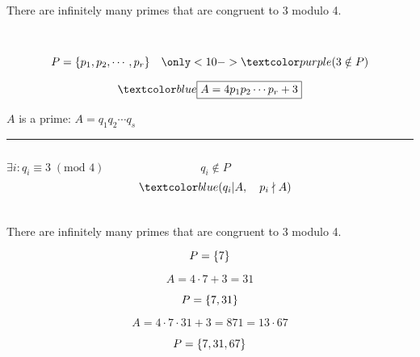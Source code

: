 
\begin{frame}{}
  \begin{Theorem}
    There are infinitely many primes that are congruent to 3 modulo 4.
  \end{Theorem}

  \pause
  \begin{center}
     \\
    
    \pause
    \vspace{-0.50cm}
    \[
      P = \set{p_1, p_2, \cdots, p_r} \quad \only<10->{\purple{(3 \notin P)}}
    \]

    \pause
    \vspace{-1.00cm}
    \[
      \blue{\boxed{A = 4 p_1 p_2 \cdots p_r + 3}}
    \]

    \pause
    $A$ is  a prime: $A = q_1 q_2 \cdots q_s$
  \end{center}

  \hrule
  \begin{columns}
      \pause
      \[
	\exists i: q_i \equiv 3\; (\text{mod } 4)
      \]
      \pause
      \vspace{-0.80cm}
      \begin{center}
	{}
      \end{center}
      \pause
      \[
	q_i \notin P
      \]
      \pause
      \vspace{-0.40cm}
      \[
	\blue{(q_i \vert A,\quad p_i \nmid A)}
      \]
  \end{columns}
\end{frame}

\begin{frame}{}
  \begin{Theorem}
    There are infinitely many primes that are congruent to 3 modulo 4.
  \end{Theorem}

  \pause
  \[
    P = \{7\}
  \]

  \pause
  \[
    A = 4 \cdot 7 + 3 = 31
  \]

  \pause
  \[
    P = \{7, 31\}
  \]

  \pause
  \[
    A = 4 \cdot 7 \cdot 31 + 3 = 871 = 13 \cdot 67
  \]

  \pause
  \[
    P = \{7, 31, 67\}
  \]
\end{frame}


